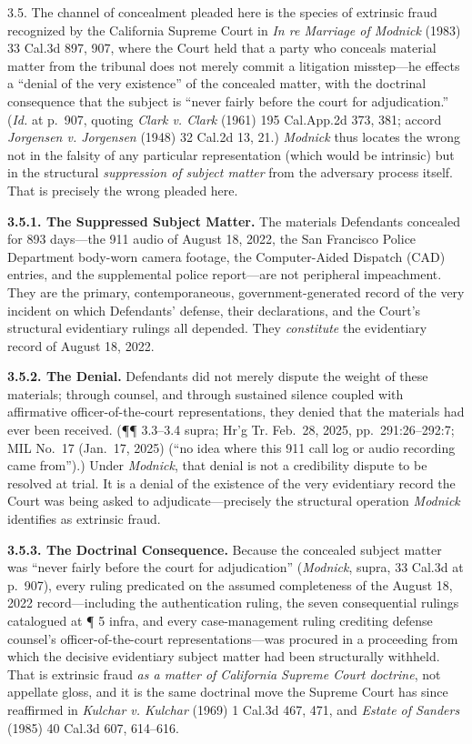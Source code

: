 3.5. The channel of concealment pleaded here is the species of extrinsic fraud recognized by the California Supreme Court in \emph{In re Marriage of Modnick} (1983) 33 Cal.3d 897, 907, where the Court held that a party who conceals material matter from the tribunal does not merely commit a litigation misstep---he effects a ``denial of the very existence'' of the concealed matter, with the doctrinal consequence that the subject is ``never fairly before the court for adjudication.'' (\emph{Id.} at p.~907, quoting \emph{Clark v. Clark} (1961) 195 Cal.App.2d 373, 381; accord \emph{Jorgensen v. Jorgensen} (1948) 32 Cal.2d 13, 21.) \emph{Modnick} thus locates the wrong not in the falsity of any particular representation (which would be intrinsic) but in the structural \emph{suppression of subject matter} from the adversary process itself. That is precisely the wrong pleaded here.

\textbf{3.5.1. The Suppressed Subject Matter.} The materials Defendants concealed for 893 days---the 911 audio of August 18, 2022, the San Francisco Police Department body-worn camera footage, the Computer-Aided Dispatch (CAD) entries, and the supplemental police report---are not peripheral impeachment. They are the primary, contemporaneous, government-generated record of the very incident on which Defendants' defense, their declarations, and the Court's structural evidentiary rulings all depended. They \emph{constitute} the evidentiary record of August 18, 2022.

\textbf{3.5.2. The Denial.} Defendants did not merely dispute the weight of these materials; through counsel, and through sustained silence coupled with affirmative officer-of-the-court representations, they denied that the materials had ever been received. (¶¶ 3.3--3.4 supra; Hr'g Tr. Feb.~28, 2025, pp.~291:26--292:7; MIL No.~17 (Jan.~17, 2025) (``no idea where this 911 call log or audio recording came from'').) Under \emph{Modnick}, that denial is not a credibility dispute to be resolved at trial. It is a denial of the existence of the very evidentiary record the Court was being asked to adjudicate---precisely the structural operation \emph{Modnick} identifies as extrinsic fraud.

\textbf{3.5.3. The Doctrinal Consequence.} Because the concealed subject matter was ``never fairly before the court for adjudication'' (\emph{Modnick}, supra, 33 Cal.3d at p.~907), every ruling predicated on the assumed completeness of the August 18, 2022 record---including the authentication ruling, the seven consequential rulings catalogued at ¶ 5 infra, and every case-management ruling crediting defense counsel's officer-of-the-court representations---was procured in a proceeding from which the decisive evidentiary subject matter had been structurally withheld. That is extrinsic fraud \emph{as a matter of California Supreme Court doctrine}, not appellate gloss, and it is the same doctrinal move the Supreme Court has since reaffirmed in \emph{Kulchar v. Kulchar} (1969) 1 Cal.3d 467, 471, and \emph{Estate of Sanders} (1985) 40 Cal.3d 607, 614--616.

